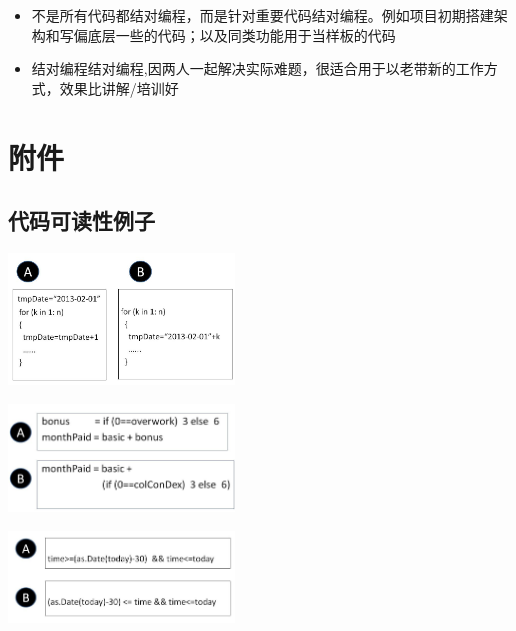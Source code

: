 \begin{itemize}
\tightlist
\item
  不是所有代码都结对编程，而是针对重要代码结对编程。例如项目初期搭建架构和写偏底层一些的代码；以及同类功能用于当样板的代码
\item
  结对编程结对编程,因两人一起解决实际难题，很适合用于以老带新的工作方式，效果比讲解/培训好
\end{itemize}

\hypertarget{ux9644ux4ef6}{%
\section{附件}\label{ux9644ux4ef6}}

\hypertarget{a.ux4ee3ux7801ux53efux8bfbux6027ux4f8bux5b50}{%
\subsection{代码可读性例子}\label{a.ux4ee3ux7801ux53efux8bfbux6027ux4f8bux5b50}}


\includegraphics[width=6cm]{leip17.jpg}


\includegraphics[width=6cm]{leip18.jpg}


\includegraphics[width=6cm]{leip19.jpg}




